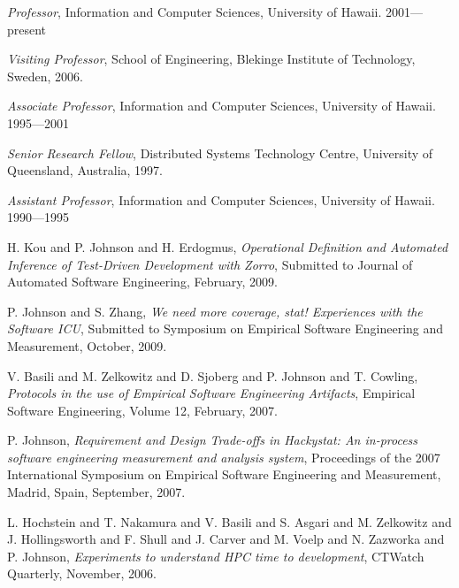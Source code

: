 \begin{Appointments}
\item {\em Professor},  Information and Computer
  Sciences, University of Hawaii.  2001---present

\item {\em Visiting Professor}, School of Engineering, Blekinge Institute of Technology, Sweden, 2006.

\item {\em Associate Professor},  Information and Computer
  Sciences, University of Hawaii.  1995---2001

\item {\em Senior Research Fellow},  Distributed Systems Technology Centre,
University of Queensland, Australia, 1997.

\item {\em Assistant Professor},   Information and Computer
  Sciences, University of Hawaii.  1990---1995

\end{Appointments}




\begin{Publications: Closely Related}

\item H. Kou and P. Johnson and H. Erdogmus, {\em Operational Definition and 
Automated Inference of Test-Driven Development with Zorro}, Submitted to 
Journal of Automated Software Engineering, February, 2009.

\item P. Johnson and S. Zhang, {\em We need more coverage, stat!  Experiences with the Software ICU}, 
Submitted to Symposium on Empirical Software Engineering and Measurement, October, 2009.
  
\item V. Basili and M. Zelkowitz and D. Sjoberg and P. Johnson and T. Cowling,
{\em Protocols in the use of Empirical Software Engineering Artifacts}, 
Empirical Software Engineering, Volume 12, February, 2007.

\item P. Johnson, {\em Requirement and Design Trade-offs in Hackystat: An
in-process software engineering measurement and analysis system},
Proceedings of the 2007 International Symposium on Empirical Software
Engineering and Measurement, Madrid, Spain, September, 2007.

\item L. Hochstein and T. Nakamura and V. Basili and S. Asgari and 
M. Zelkowitz and J. Hollingsworth and F. Shull and J. Carver and 
M. Voelp and N. Zazworka and P. Johnson, {\em Experiments to 
understand HPC time to development}, CTWatch Quarterly, 
November, 2006.

\end{Publications: Closely Related}


